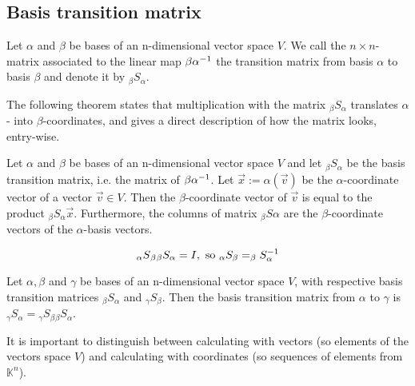 \subsection{Basis transition matrix}

\begin{definition}
    Let $\alpha$ and $\beta$ be bases of an n-dimensional vector space $V$. We call the $n \times n$-matrix associated
    to the linear map $\beta\alpha^{-1}$ the transition matrix from basis $\alpha$ to basis $\beta$ and denote it by $_\beta S _\alpha$.
\end{definition}

The following theorem states that multiplication with the matrix $_\beta S _\alpha$ translates $\alpha$- into $\beta$-coordinates,
and gives a direct description of how the matrix looks, entry-wise.

\begin{theorem}
    Let $\alpha$ and $\beta$ be bases of an n-dimensional vector space $V$ and let $_\beta S _\alpha$ be the basis transition matrix,
    i.e. the matrix of $\beta\alpha^{-1}$. Let $\vec{x}:=\alpha(\vec{v})$ be the $\alpha$-coordinate vector of a vector $\vec{v} \in V$.
    Then the $\beta$-coordinate vector of $\vec{v}$ is equal to the product $_\beta S _\alpha \vec{x}$. Furthermore, the columns
    of matrix $_\beta S \alpha$ are the $\beta$-coordinate vectors of the $\alpha$-basis vectors.
\end{theorem}

\begin{remark}
    $$_\alpha S {_\beta} {_\beta} S _\alpha = I, \text{ so } _\alpha S _\beta = _\beta S _\alpha ^{-1}$$
\end{remark}

\begin{theorem}
    Let $\alpha, \beta$ and $\gamma$ be bases of an n-dimensional vector space $V$, with respective basis transition
    matrices $_\beta S _\alpha$ and $_\gamma S _\beta$. Then the basis transition matrix from $\alpha$ to $\gamma$ is
    $_\gamma S _\alpha = {_\gamma} S _\beta {_\beta} S _\alpha$.
\end{theorem}

\begin{remark}
    It is important to distinguish between calculating with vectors (so elements of the vectors space $V$) and calculating
    with coordinates (so sequences of elements from $\mathbb{K}^n$).
\end{remark}

